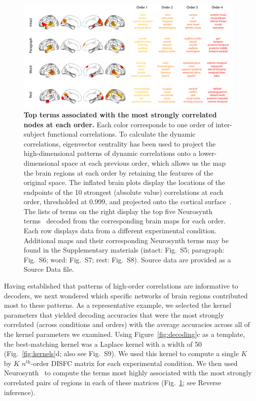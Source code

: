 \documentclass[english]{article}
\newcommand{\intact}{S5}
\newcommand{\para}{S6}
\newcommand{\word}{S7}
\newcommand{\rest}{S8}
\newcommand{\pca}{S9}
\begin{document}
\begin{figure}[tp]
  \centering
  \includegraphics[width=\textwidth]{figs/most_abs}
  \caption{\textbf{Top terms associated with the most strongly
       correlated nodes at each order.}  Each color corresponds to one order of
    inter-subject functional correlations.  To calculate the dynamic
    correlations, eigenvector centrality has been used to project
    the high-dimensional patterns of dynamic correlations onto a
    lower-dimensional space at each previous order, which allows us
    the map the brain regions at each order by retaining the
    features of the original space. The inflated brain plots
    display the locations of the endpoints of the 10 strongest
    (absolute value) correlations at each order, thresholded at 0.999,
    and projected onto the cortical surface~\citep{CombEtal19}.  The
    lists of terms on the right display the top five Neurosynth
    terms~\citep{RubiEtal17} decoded from the corresponding brain maps
    for each order.  Each row displays data from a different
    experimental condition.  Additional maps and their corresponding
    Neurosynth terms may be found in the Supplementary
      materials (intact: Fig.~\intact; paragraph: Fig.~\para; word:
    Fig.~\word; rest: Fig.~\rest). Source data are provided as a Source Data file.}
  \label{fig:neurosynth}
\end{figure}

Having established that patterns of high-order correlations are
informative to decoders, we next wondered which specific networks of
brain regions contributed most to these patterns.  As a representative
example, we selected the kernel parameters that yielded decoding
accuracies that were the most strongly correlated (across conditions
and orders) with the average accuracies across all of the
kernel parameters we examined.  Using Figure~\ref{fig:decoding}c as a
template, the best-matching kernel was a Laplace kernel with a width
of 50 (Fig.~\ref{fig:kernels}d; also see Fig.~\pca).  We used this kernel to compute a
single $K$ by $K$ $n^\mathrm{th}$-order DISFC matrix for each
experimental condition.  We then used Neurosynth~\citep{RubiEtal17} to
compute the terms most highly associated with the most strongly
correlated pairs of regions in each of these matrices
(Fig.~\ref{fig:neurosynth}; see Reverse inference).
\end{document}
